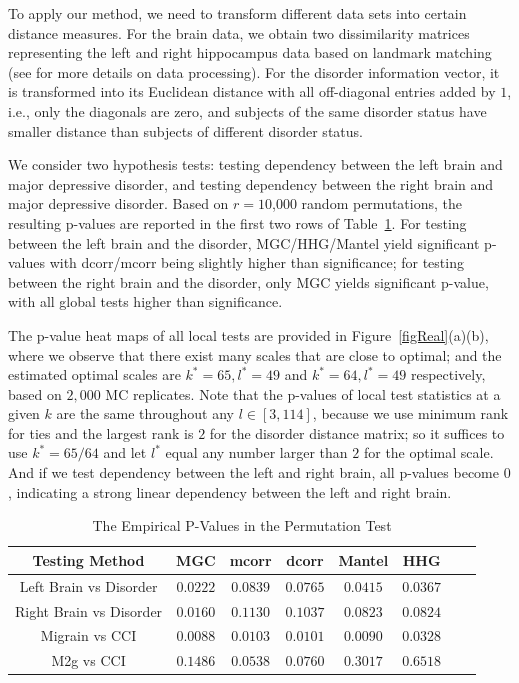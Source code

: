 \documentclass[11pt]{article}
\begin{document}
To apply our method, we need to transform different data sets into certain distance measures. For the brain data, we obtain two dissimilarity matrices representing the left and right hippocampus data based on landmark matching (see \cite{ParkEtAl2011} for more details on data processing). For the disorder information vector, it is transformed into its Euclidean distance with all off-diagonal entries added by $1$, i.e., only the diagonals are zero, and subjects of the same disorder status have smaller distance than subjects of different disorder status. 

We consider two hypothesis tests: testing dependency between the left brain and major depressive disorder, and testing dependency between the right brain and major depressive disorder. Based on $r=10$,$000$ random permutations, the resulting p-values are reported in the first two rows of Table~\ref{table1}. For testing between the left brain and the disorder, MGC/HHG/Mantel yield significant p-values with dcorr/mcorr being slightly higher than significance; for testing between the right brain and the disorder, only MGC yields significant p-value, with all global tests higher than significance. 

The p-value heat maps of all local tests are provided in Figure~\ref{figReal}(a)(b), where we observe that there exist many scales that are close to optimal; and the estimated optimal scales are $k^{*}=65,l^{*}=49$ and $k^{*}=64,l^{*}=49$ respectively, based on $2,000$ MC replicates. Note that the p-values of local test statistics at a given $k$ are the same throughout any $l \in [3,114]$, because we use minimum rank for ties and the largest rank is $2$ for the disorder distance matrix; so it suffices to use $k^{*}=65/64$ and let $l^{*}$ equal any number larger than $2$ for the optimal scale. And if we test dependency between the left and right brain, all p-values become $0$, indicating a strong linear dependency between the left and right brain.

\begin{table}[!t]
\footnotesize
\renewcommand{\arraystretch}{0.5}
\centering
{\begin{tabular}{|c||c|c|c|c|c|c|c|}
\hline
Testing Method & MGC & mcorr & dcorr & Mantel & HHG \\
\hline
Left Brain vs Disorder  & $0.0222$ & $0.0839$ & $0.0765$ & $0.0415$ & $0.0367$ \\
\hline
Right Brain vs Disorder & $0.0160$ & $0.1130$ & $0.1037$  & $0.0823$ & $0.0824$\\
\hline
Migrain vs CCI & $0.0088$ & $0.0103$ & $0.0101$  & $0.0090$ & $0.0328$\\
\hline
M2g vs CCI & $0.1486$ & $0.0538$ & $0.0760$  & $0.3017$ & $0.6518$\\
\hline
\end{tabular}
\caption{The Empirical P-Values in the Permutation Test}
\label{table1}
}
\end{table}
\end{document}
